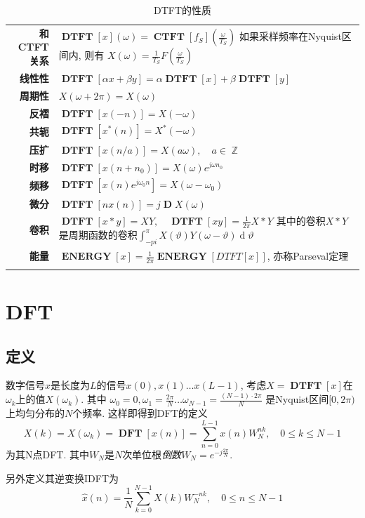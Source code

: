 \documentclass{ctexart}
\DeclareMathOperator{\CTFT}{\mathbf{CTFT}}
\DeclareMathOperator{\DTFT}{\mathbf{DTFT}}
\DeclareMathOperator{\DFT}{\mathbf{DFT}}
\DeclareMathOperator{\ENERGY}{\mathbf{ENERGY}}
\DeclareMathOperator{\D}{\mathbf{D}}
\DeclareMathOperator{\ud}{\mathrm{d}}
\DeclareMathOperator{\Zset}{\mathbb{Z}}
\newlength{\Oldarrayrulewidth}
\newcommand{\Hline}[1]{
  \noalign{\global\setlength{\Oldarrayrulewidth}{\arrayrulewidth}}
  \noalign{\global\setlength{\arrayrulewidth}{#1}}\hline
  \noalign{\global\setlength{\arrayrulewidth}{\Oldarrayrulewidth}}}
\newcommand{\Topline}{\Hline{0.08em}}
\newcommand{\Bottomline}{\Hline{0.08em}}
\begin{document}
    \begin{table}[ht!]
    \begin{tabularx}{\textwidth}{|>{\bfseries}r  L|}
        \Topline
        和CTFT关系 & $\displaystyle \DTFT[x](\omega) = \CTFT[f_S](\frac{\omega}{T_S})$
            如果采样频率在Nyquist区间内, 则有 $X(\omega) = \frac{1}{T_S} F\left(\frac{\omega}{T_S}\right)$\\
        线性性 & $\displaystyle \DTFT[\alpha x + \beta y] = \alpha \DTFT[x] + \beta \DTFT[y]$\\
        周期性 & $\displaystyle X(\omega + 2\pi) = X(\omega)$\\
        反褶 & $\displaystyle \DTFT[x(-n)] = X(-\omega)$\\
        共轭 & $\displaystyle \DTFT[x^*(n)] = X^*(-\omega)$\\
        压扩 & $\displaystyle \DTFT[x(n/a)] = X(a\omega), \quad a \in \Zset$\\
        时移 & $\displaystyle \DTFT[x(n + n_0)] = X(\omega) e^{j \omega n_0}$\\
        频移 & $\displaystyle \DTFT[x(n) e^{j \omega_0 n}] = X(\omega - \omega_0)$\\
        微分 & $\displaystyle \DTFT[nx(n)] = j \D X(\omega)$\\
        卷积 & $\displaystyle \DTFT[x * y] = X Y,\quad \DTFT[x y] = \frac{1}{2\pi} X * Y$
            其中的卷积$X * Y$是周期函数的卷积$\int_{-pi}^{\pi} X(\vartheta) Y(\omega - \vartheta) \ud \vartheta$\\
        能量 & $\displaystyle \ENERGY[x] = \frac{1}{2\pi} \ENERGY[DTFT[x]]$, 亦称Parseval定理\\
        \Bottomline
    \end{tabularx}
    \caption{DTFT的性质}
    \end{table}

\clearpage

\section{DFT}
\subsection{定义}
    数字信号$x$是长度为$L$的信号$x(0), x(1) \ldots x(L - 1)$,
    考虑$X = \DTFT[x]$在$\omega_k$上的值$X(\omega_k)$. 其中
    $\omega_0 = 0, \omega_1 = \frac{2\pi}{N} \ldots \omega_{N - 1} = \frac{(N-1) \cdot 2\pi}{N}$
    是Nyquist区间$[0, 2\pi)$上均匀分布的$N$个频率. 这样即得到DFT的定义
    \[
        X(k) = X(\omega_k) = \DFT[x(n)] = \sum_{n = 0}^{L - 1} x(n) W_N^{nk},\quad 0 \le k \le N - 1\]
    为其N点DFT. 其中$W_N$是$N$次单位根\emph{倒数}$W_N = e^{- j \frac{2 \pi}{N}}$.\par
    另外定义其逆变换IDFT为\[
        \hat{x}(n) = \frac{1}{N} \sum_{k = 0}^{N - 1} X(k) W_N^{-nk},\quad 0 \le n  \le N -1 \]
\end{document}
